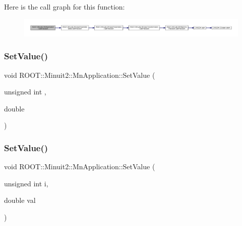 Here is the call graph for this function\+:
\nopagebreak
\begin{figure}[H]
\begin{center}
\leavevmode
\includegraphics[width=350pt]{df/dd5/classROOT_1_1Minuit2_1_1MnApplication_a054caa9f6e7b2617c182b6b43b97c900_cgraph}
\end{center}
\end{figure}
\mbox{\label{classROOT_1_1Minuit2_1_1MnApplication_af6147ded182dfe93c2200d621050c642}} 
\subsubsection{\texorpdfstring{SetValue()}{SetValue()}\hspace{0.1cm}{\footnotesize\ttfamily [1/6]}}
{\footnotesize\ttfamily void R\+O\+O\+T\+::\+Minuit2\+::\+Mn\+Application\+::\+Set\+Value (\begin{DoxyParamCaption}\item[{unsigned int}]{,  }\item[{double}]{ }\end{DoxyParamCaption})}

\mbox{\label{classROOT_1_1Minuit2_1_1MnApplication_af6147ded182dfe93c2200d621050c642}} 
\subsubsection{\texorpdfstring{SetValue()}{SetValue()}\hspace{0.1cm}{\footnotesize\ttfamily [2/6]}}
{\footnotesize\ttfamily void R\+O\+O\+T\+::\+Minuit2\+::\+Mn\+Application\+::\+Set\+Value (\begin{DoxyParamCaption}\item[{unsigned int}]{i,  }\item[{double}]{val }\end{DoxyParamCaption})}

